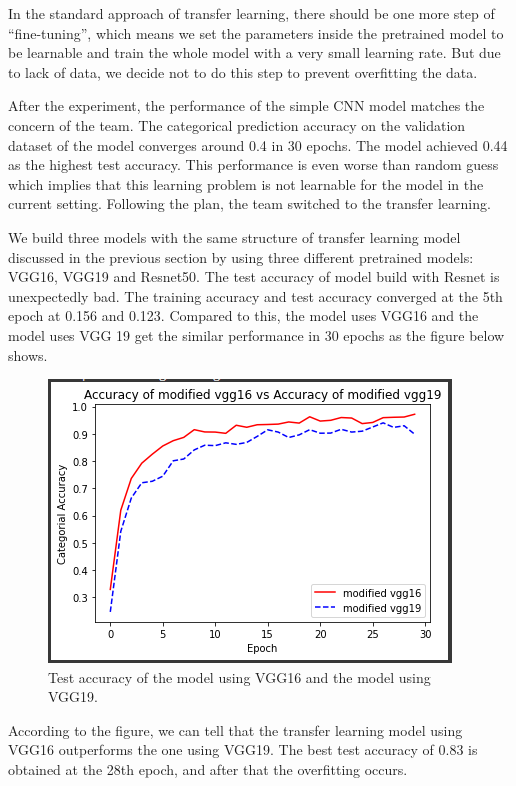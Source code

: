 \documentclass[a4paper,12pt]{article}
\begin{document}
\begin{spacing}{1.3}
In the standard approach of transfer learning, there should be one more step of “fine-tuning”, which means we set the parameters inside the pretrained model to be learnable and train the whole model with a very small learning rate. But due to lack of data, we decide not to do this step to prevent overfitting the data.

After the experiment, the performance of the simple CNN model matches the concern of the team. The categorical prediction accuracy on the validation dataset of the model converges around 0.4 in 30 epochs. The model achieved 0.44 as the highest test accuracy. This performance is even worse than random guess which implies that this learning problem is not learnable for the model in the current setting. Following the plan, the team switched to the transfer learning.

We build three models with the same structure of transfer learning model discussed in the previous section by using three different pretrained models: VGG16, VGG19 and Resnet50. The test accuracy of model build with Resnet is unexpectedly bad. The training accuracy and test accuracy converged at the 5th epoch at 0.156 and 0.123. Compared to this, the model uses VGG16 and the model uses VGG 19 get the similar performance in 30 epochs as the figure below shows.

\begin{figure}[H]
	\centering
	\includegraphics[scale=0.6]{10.png}
	\caption{Test accuracy of the model using VGG16 and the model using VGG19.}
\end{figure}

According to the figure, we can tell that the transfer learning model using VGG16 outperforms the one using VGG19. The best test accuracy of 0.83 is obtained at the 28th epoch, and after that the overfitting occurs.


\end{spacing}
\end{document}
